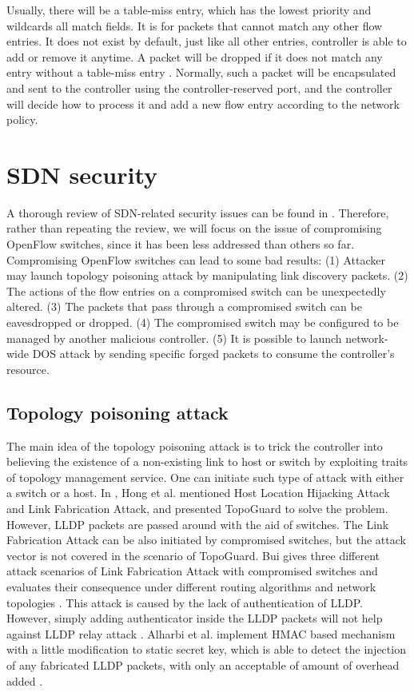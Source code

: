 Usually, there will be a table-miss entry, which has the lowest priority and wildcards all match fields. It is for packets that cannot match any other flow entries. It does not exist by default, just like all other entries, controller is able to add or remove it anytime. A packet will be dropped if it does not match any entry without a table-miss entry \cite{OF_SPEC}. Normally, such a packet will be encapsulated and sent to the controller using the controller-reserved port, and the controller will decide how to process it and add a new flow entry according to the network policy. 

\section{SDN security}
\label{SDN security}
A thorough review of SDN-related security issues can be found in \cite{LAB14, CM, SOS13, KJK}. Therefore, rather than repeating the review, we will focus on the issue of compromising OpenFlow switches, since it has been less addressed than others so far. Compromising OpenFlow switches can lead to some bad results: (1) Attacker may launch topology poisoning attack by manipulating link discovery packets. (2) The actions of the flow entries on a compromised switch can be unexpectedly altered. (3) The packets that pass through a compromised switch can be eavesdropped or dropped. (4) The compromised switch may be configured to be managed by another malicious controller. (5) It is possible to launch network-wide DOS attack by sending specific forged packets to consume the controller's resource.

\subsection{Topology poisoning attack}
The main idea of the topology poisoning attack is to trick the controller into believing the existence of a non-existing link to host or switch by exploiting traits of topology management service. One can initiate such type of attack with either a switch or a host. In \cite{HXWG15}, Hong et al. mentioned Host Location Hijacking Attack and Link Fabrication Attack, and presented TopoGuard to solve the problem. However, LLDP packets are passed around with the aid of switches. The Link Fabrication Attack can be also initiated by compromised switches, but the attack vector  is not covered in the scenario of TopoGuard. Bui gives three different attack scenarios of Link Fabrication Attack with compromised switches and evaluates their consequence under different routing algorithms and network topologies \cite{TTB15}. This attack is caused by the lack of authentication of LLDP. However, simply adding authenticator inside the LLDP packets will not help against LLDP relay attack \cite{HXWG15}. Alharbi et al. implement HMAC based mechanism with a little modification to static secret key, which is able to detect the injection of any fabricated LLDP packets, with only an acceptable of amount of overhead added \cite{ATPP15}.

